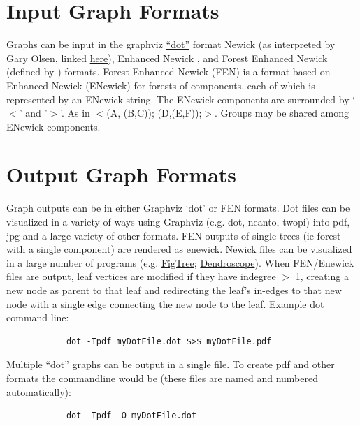 \documentclass[11pt]{book}
\begin{document}
{{\section{Input Graph Formats}
	Graphs can be input in the graphviz \href{https://graphviz.org/}{``dot''} format Newick (as 		
	interpreted by Gary Olsen, linked \href{https://evolution.genetics.washington.edu/phylip/newick_doc.html}
	{here}), Enhanced Newick \cite{Cardonaetal2008}, and Forest Enhanced Newick (defined by 
	\citealp{WheelerPhyloSuperGraphs}) formats.
	Forest Enhanced Newick (FEN) is a format based on Enhanced Newick (ENewick) for 
	forests of components, each of which is represented by an ENewick string.  The ENewick 
	components are surrounded by `$<$' and '$>$'. As in $<$(A, (B,C)); (D,(E,F));$>$.  
	Groups may be shared among ENewick components.
	
\section{Output Graph Formats}
	Graph outputs can be in either Graphviz `dot' or FEN formats.  Dot files can be visualized in a variety of ways 
	using Graphviz (e.g. dot, neanto, twopi) into pdf, jpg and a large variety of other formats. FEN outputs of 
	single trees (ie forest with a single component) are rendered as enewick.  Newick files can be visualized in a 
	large number of programs (e.g. \href{http://tree.bio.ed.ac.uk/software/figtree/}{FigTree}; 
	\href{http:/https://uni-tuebingen.de/fakultaeten/mathematisch-naturwissenschaftliche-fakultaet/fachbereiche/informatik/lehrstuehle/algorithms-in-bioinformatics/software/}
	{Dendroscope}). 	
	When FEN/Enewick files are output, leaf vertices are modified if they have indegree $>$ 1, creating a new node as parent to that leaf
	and redirecting the leaf's in-edges to that new node with a single edge connecting the new node to the leaf.  Example dot command line: 
	
		\begin{verbatim}
			dot -Tpdf myDotFile.dot $>$ myDotFile.pdf
		\end{verbatim}
		
	Multiple ``dot'' graphs can be output in a single file.  To create pdf and other formats the
	commandline would be (these files are named and numbered automatically):
	
		\begin{verbatim}
			dot -Tpdf -O myDotFile.dot
		\end{verbatim}
		
}}
\end{document}
